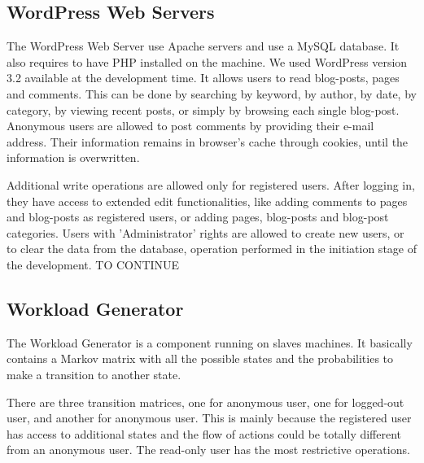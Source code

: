 \subsection{WordPress Web Servers}
\label{sub-sec:wordpress-web-servers}

The WordPress Web Server use Apache servers and use a MySQL database. It also requires to have PHP installed on the machine. We used WordPress version 3.2 available at the development time. It allows users to read blog-posts, pages and comments. This can be done by searching by keyword, by author, by date, by category, by viewing recent posts, or simply by browsing each single blog-post. Anonymous users are allowed to post comments by providing their e-mail address. Their information remains in browser's cache through cookies, until the information is overwritten.

Additional write operations are allowed only for registered users. After logging in, they have access to extended edit functionalities, like adding comments to pages and blog-posts as registered users, or adding pages, blog-posts and blog-post categories. Users with 'Administrator' rights are allowed to create new users, or to clear the data from the database, operation performed in the initiation stage of the development. TO CONTINUE

\subsection{Workload Generator}
\label{sub-sec:workload-generator}

The Workload Generator is a component running on slaves machines. It basically contains a Markov matrix with all the possible states and the probabilities to make a transition to another state. 

There are three transition matrices, one for anonymous user, one for logged-out user, and another for anonymous user. This is mainly because the registered user has access to additional states and the flow of actions could be totally different from an anonymous user. The read-only user has the most restrictive operations.

